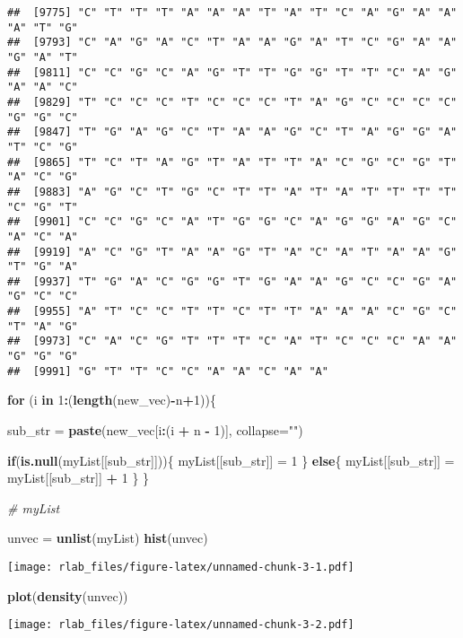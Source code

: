 \documentclass[
]{article}
\newenvironment{Shaded}{\begin{snugshade}}{\end{snugshade}}
\newcommand{\AttributeTok}[1]{\textcolor[rgb]{0.13,0.29,0.53}{#1}}
\newcommand{\CommentTok}[1]{\textcolor[rgb]{0.56,0.35,0.01}{\textit{#1}}}
\newcommand{\ControlFlowTok}[1]{\textcolor[rgb]{0.13,0.29,0.53}{\textbf{#1}}}
\newcommand{\DecValTok}[1]{\textcolor[rgb]{0.00,0.00,0.81}{#1}}
\newcommand{\FunctionTok}[1]{\textcolor[rgb]{0.13,0.29,0.53}{\textbf{#1}}}
\newcommand{\NormalTok}[1]{#1}
\newcommand{\OtherTok}[1]{\textcolor[rgb]{0.56,0.35,0.01}{#1}}
\newcommand{\SpecialCharTok}[1]{\textcolor[rgb]{0.81,0.36,0.00}{\textbf{#1}}}
\newcommand{\StringTok}[1]{\textcolor[rgb]{0.31,0.60,0.02}{#1}}
\begin{document}
\begin{verbatim}
##  [9775] "C" "T" "T" "T" "A" "A" "A" "T" "A" "T" "C" "A" "G" "A" "A" "A" "T" "G"
##  [9793] "C" "A" "G" "A" "C" "T" "A" "A" "G" "A" "T" "C" "G" "A" "A" "G" "A" "T"
##  [9811] "C" "C" "G" "C" "A" "G" "T" "T" "G" "G" "T" "T" "C" "A" "G" "A" "A" "C"
##  [9829] "T" "C" "C" "C" "T" "C" "C" "C" "T" "A" "G" "C" "C" "C" "C" "G" "G" "C"
##  [9847] "T" "G" "A" "G" "C" "T" "A" "A" "G" "C" "T" "A" "G" "G" "A" "T" "C" "G"
##  [9865] "T" "C" "T" "A" "G" "T" "A" "T" "T" "A" "C" "G" "C" "G" "T" "A" "C" "G"
##  [9883] "A" "G" "C" "T" "G" "C" "T" "T" "A" "T" "A" "T" "T" "T" "T" "C" "G" "T"
##  [9901] "C" "C" "G" "C" "A" "T" "G" "G" "C" "A" "G" "G" "A" "G" "C" "A" "C" "A"
##  [9919] "A" "C" "G" "T" "A" "A" "G" "T" "A" "C" "A" "T" "A" "A" "G" "T" "G" "A"
##  [9937] "T" "G" "A" "C" "G" "G" "T" "G" "A" "A" "G" "C" "C" "G" "A" "G" "C" "C"
##  [9955] "A" "T" "C" "C" "T" "T" "C" "T" "T" "A" "A" "A" "C" "G" "C" "T" "A" "G"
##  [9973] "C" "A" "C" "G" "T" "T" "T" "C" "A" "T" "C" "C" "C" "A" "A" "G" "G" "G"
##  [9991] "G" "T" "T" "C" "C" "A" "A" "C" "A" "A"
\end{verbatim}

\begin{Shaded}
\begin{Highlighting}[]
\ControlFlowTok{for}\NormalTok{ (i }\ControlFlowTok{in} \DecValTok{1}\SpecialCharTok{:}\NormalTok{(}\FunctionTok{length}\NormalTok{(new\_vec)}\SpecialCharTok{{-}}\NormalTok{n}\SpecialCharTok{+}\DecValTok{1}\NormalTok{))\{}
 
\NormalTok{   sub\_str }\OtherTok{=} \FunctionTok{paste}\NormalTok{(new\_vec[i}\SpecialCharTok{:}\NormalTok{(i }\SpecialCharTok{+}\NormalTok{ n }\SpecialCharTok{{-}} \DecValTok{1}\NormalTok{)], }\AttributeTok{collapse=}\StringTok{""}\NormalTok{)}
  
  \ControlFlowTok{if}\NormalTok{(}\FunctionTok{is.null}\NormalTok{(myList[[sub\_str]]))\{}
\NormalTok{    myList[[sub\_str]] }\OtherTok{=} \DecValTok{1}
\NormalTok{  \}}
  \ControlFlowTok{else}\NormalTok{\{}
\NormalTok{    myList[[sub\_str]] }\OtherTok{=}\NormalTok{ myList[[sub\_str]] }\SpecialCharTok{+} \DecValTok{1}
\NormalTok{  \}}
\NormalTok{\}}

\CommentTok{\# myList}


\NormalTok{unvec }\OtherTok{=} \FunctionTok{unlist}\NormalTok{(myList)}
\FunctionTok{hist}\NormalTok{(unvec)}
\end{Highlighting}
\end{Shaded}

\texttt{[image: rlab\_files/figure-latex/unnamed-chunk-3-1.pdf]}

\begin{Shaded}
\begin{Highlighting}[]
\FunctionTok{plot}\NormalTok{(}\FunctionTok{density}\NormalTok{(unvec))}
\end{Highlighting}
\end{Shaded}

\texttt{[image: rlab\_files/figure-latex/unnamed-chunk-3-2.pdf]}
\end{document}

